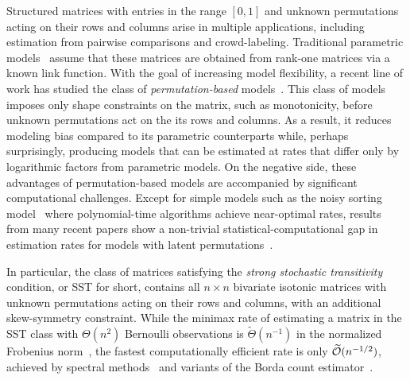 \documentclass[final,12pt]{colt2018} %
\begin{document}
Structured matrices with entries in the range $[0, 1]$ and unknown
permutations acting on their rows and columns arise in multiple
applications, including estimation from pairwise comparisons
and crowd-labeling.
Traditional parametric models~\citep{BraTer52,Luc59,Thu27,DawSke79} assume that these
matrices are obtained from rank-one matrices via a known link
function.
With the goal of increasing
model flexibility, a recent line of work has studied the class of
\emph{permutation-based} models~\citep{Cha15,
ShaBalGunWai17,ShaBalWai16}.  
This class of models imposes only shape
constraints on the matrix, such as monotonicity, before unknown
permutations act on the its rows and columns. As a result, it reduces modeling bias compared to its parametric counterparts
while, perhaps surprisingly, producing models that can be estimated at
rates that differ only by logarithmic factors from parametric models. On
the negative side, these advantages of permutation-based models are
accompanied by significant computational challenges. 
Except for simple models such as the noisy sorting model~\citep{BraMos08,MaoWeeRig17} where polynomial-time algorithms achieve near-optimal rates, results from many
recent papers show a non-trivial statistical-computational gap in
estimation rates for models with latent
permutations~\citep{ShaBalGunWai17,ChaMuk16,ShaBalWai16,FlaMaoRig16,PanWaiCou17}.

In particular, the class of matrices satisfying the \emph{strong stochastic
  transitivity} condition, or SST for short,
contains all $n \times n$ bivariate isotonic matrices with unknown
permutations acting on their rows and columns, with an additional
skew-symmetry constraint.
While the minimax rate of estimating a matrix in the SST class with $\Theta(n^2)$ Bernoulli observations is $\widetilde
\Theta (n^{-1})$ in the normalized Frobenius norm~\citep{ShaBalGunWai17}, the fastest computationally efficient rate is only $\widetilde{\mathcal{O}} (n^{-1/2})$, achieved by spectral methods~\citep{Cha15,ShaBalGunWai17} and variants of the Borda count estimator~\citep{ShaBalWai16-2,ChaMuk16,PanMaoMutWaiCou17}.
\end{document}
